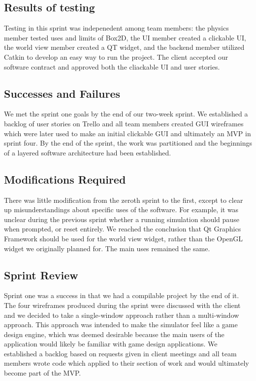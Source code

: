 \subsection{Results of testing}

Testing in this sprint was indepenedent among team members: the physics member tested uses and limits of Box2D, the UI member created a clickable UI, the world view member created a QT widget, and the backend member utilized Catkin to develop an easy way to run the project. The client accepted our software contract and approved both the cliackable UI and user stories.

\subsection{Successes and Failures}

We met the sprint one goals by the end of our two-week sprint. We established a backlog of user stories on Trello and all team members created GUI wireframes which were later used to make an initial clickable GUI and ultimately an MVP in sprint four. By the end of the sprint, the work was partitioned and the beginnings of a layered software architecture had been established.

\subsection{Modifications Required}

There was little modification from the zeroth sprint to the first, except to clear up misunderstandings about specific uses of the software. For example, it was unclear during the previous sprint whether a running simulation should pause when prompted, or reset entirely. We reached the conclusion that Qt Graphics Framework should be used for the world view widget, rather than the OpenGL widget we originally planned for. The main uses remained the same.

\subsection{Sprint Review}

Sprint one was a success in that we had a compilable project by the end of it. The four wireframes produced during the sprint were discussed with the client and we decided to take a single-window approach rather than a multi-window approach. This approach was intended to make the simulator feel like a game design engine, which was deemed desirable because the main users of the application would likely be familiar with game design applications. We established a backlog based on requests given in client meetings and all team members wrote code which applied to their section of work and would ultimately become part of the MVP.

